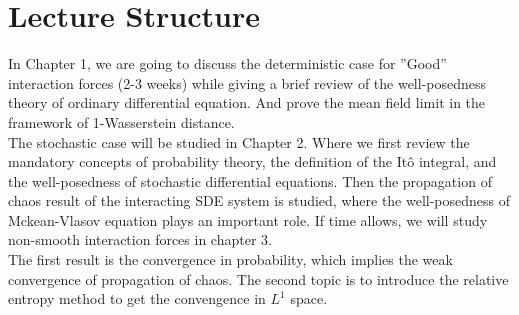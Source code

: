 \section{Lecture Structure}
In Chapter 1, we are going to discuss the deterministic case for ”Good”
interaction forces (2-3 weeks) while giving a brief review of the well-posedness theory of ordinary
differential equation. And prove the mean field limit in the framework of 1-Wasserstein distance.\\[1ex]
The stochastic case will be studied in Chapter 2. Where we first review the mandatory concepts
of probability theory, the definition of the It\^{o} integral, and the well-posedness of stochastic
differential equations. Then the propagation of chaos result of the interacting SDE system
is studied, where the well-posedness of Mckean-Vlasov equation plays an important role.
If time allows, we will study non-smooth interaction forces in chapter 3.\\[1ex]
The first result is the convergence in probability, which implies the weak convergence of propagation of
chaos. The second topic is to introduce the relative entropy method to get the convengence
in $L^{1}$ space.
